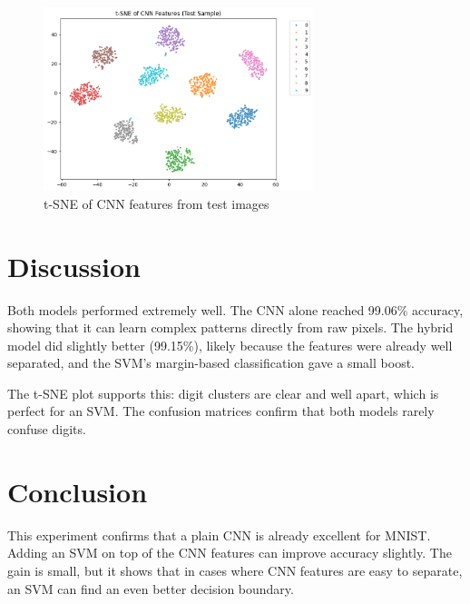 \documentclass{article}
\begin{document}
\begin{figure}[h!]
\centering
\includegraphics[width=0.7\textwidth]{sne-features.png} 
\caption{t-SNE of CNN features from test images}
\label{fig:tsne}
\end{figure}

\section{Discussion}
Both models performed extremely well. The CNN alone reached 99.06\% accuracy, showing that it can learn complex patterns directly from raw pixels. The hybrid model did slightly better (99.15\%), likely because the features were already well separated, and the SVM’s margin-based classification gave a small boost.

The t-SNE plot supports this: digit clusters are clear and well apart, which is perfect for an SVM. The confusion matrices confirm that both models rarely confuse digits.

\section{Conclusion}
This experiment confirms that a plain CNN is already excellent for MNIST. Adding an SVM on top of the CNN features can improve accuracy slightly. The gain is small, but it shows that in cases where CNN features are easy to separate, an SVM can find an even better decision boundary.
\end{document}
